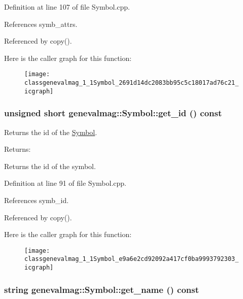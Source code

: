 Definition at line 107 of file Symbol.cpp.

References symb\_\-attrs.

Referenced by copy().

Here is the caller graph for this function:\nopagebreak
\begin{figure}[H]
\begin{center}
\leavevmode
\texttt{[image: classgenevalmag\_1\_1Symbol\_2691d14dc2083bb95c5c18017ad76c21\_icgraph]}
\end{center}
\end{figure}
\hypertarget{classgenevalmag_1_1Symbol_e9a6e2cd92092a417cf0ba9993792303}{
\subsubsection[{get\_\-id}]{\setlength{\rightskip}{0pt plus 5cm}unsigned short genevalmag::Symbol::get\_\-id () const}}
\label{classgenevalmag_1_1Symbol_e9a6e2cd92092a417cf0ba9993792303}


Returns the id of the \hyperlink{classgenevalmag_1_1Symbol}{Symbol}. \begin{Desc}
\item[Returns:]\end{Desc}
Returns the id of the symbol. 

Definition at line 91 of file Symbol.cpp.

References symb\_\-id.

Referenced by copy().

Here is the caller graph for this function:\nopagebreak
\begin{figure}[H]
\begin{center}
\leavevmode
\texttt{[image: classgenevalmag\_1\_1Symbol\_e9a6e2cd92092a417cf0ba9993792303\_icgraph]}
\end{center}
\end{figure}
\hypertarget{classgenevalmag_1_1Symbol_fcd9c46fe546ec9f1b62caeb99377917}{
\subsubsection[{get\_\-name}]{\setlength{\rightskip}{0pt plus 5cm}string genevalmag::Symbol::get\_\-name () const}}
\label{classgenevalmag_1_1Symbol_fcd9c46fe546ec9f1b62caeb99377917}


